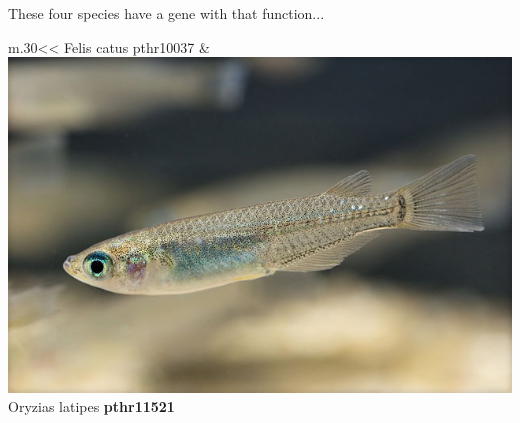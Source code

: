 \documentclass[aspectratio=169, 9pt]{beamer}\usepackage[]{graphicx}\usepackage[]{color}
\begin{document}
\begin{frame}[t]

These four species have a gene with that function... 

\vfill

\def\tmpwidth{.30\linewidth}
\begin{table}
\footnotesize
\begin{tabular}{*{2}{m{\tmpwidth}<\centering}}
   \linebreak Felis catus pthr10037 & %
\includegraphics[width=1\linewidth]{Oryzias_latipes.jpg} \linebreak Oryzias latipes \textbf{pthr11521} \\ %

\end{tabular}
\end{table}
\end{frame}
\end{document}
